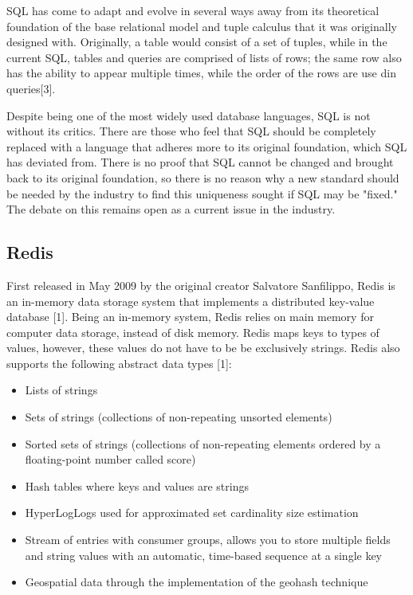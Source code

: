 \documentclass[letterpaper, 10 pt, conference]{ieeeconf}
\begin{document}
SQL has come to adapt and evolve in several ways away from its theoretical foundation of the base relational model and tuple calculus that it was originally designed with. Originally, a table would consist of a set of tuples, while in the current SQL, tables and queries are comprised of lists of rows; the same row also has the ability to appear multiple times, while the order of the rows are use din queries[3].


Despite being one of the most widely used database languages, SQL is not without its critics. There are those who feel that SQL should be completely replaced with a language that adheres more to its original foundation, which SQL has deviated from. There is no proof that SQL cannot be changed and brought back to its original foundation, so there is no reason why a new standard should be needed by the industry to find this uniqueness sought if SQL may be "fixed." The debate on this remains open as a current issue in the industry. 

\subsection{Redis}

First released in May 2009 by the original creator Salvatore Sanfilippo, Redis is an in-memory data storage system that implements a distributed key-value database [1]. Being an in-memory system, Redis relies on main memory for computer data storage, instead of disk memory. Redis maps keys to types of values, however, these values do not have to be be exclusively strings. Redis also supports the following abstract data types [1]:
\begin{itemize}
    \item Lists of strings
    \item Sets of strings (collections of non-repeating unsorted elements)
    \item Sorted sets of strings (collections of non-repeating elements ordered by a floating-point number called score)
    \item Hash tables where keys and values are strings
    \item HyperLogLogs used for approximated set cardinality size estimation
    \item Stream of entries with consumer groups, allows you to store multiple fields and string values with an automatic, time-based sequence at a single key
    \item Geospatial data through the implementation of the geohash technique
\end{itemize}
\end{document}
